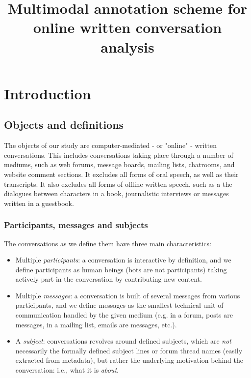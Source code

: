 \documentclass[11pt]{article}
\begin{document}
\title{Multimodal annotation scheme for online written conversation analysis}

\begin{titlepage}

\maketitle

\tableofcontents

\end{titlepage}

\section{Introduction}

\subsection{Objects and definitions}

The objects of our study are computer-mediated - or "online" - written conversations. This includes conversations taking place through a number of mediums, such as web forums, message boards, mailing lists, chatrooms, and website comment sections. It excludes all forms of oral speech, as well as their transcripts. It also excludes all forms of offline written speech, such as a the dialogues between characters in a book, journalistic interviews or messages written in a guestbook. 

\subsubsection{Participants, messages and subjects}

The conversations as we define them have three main characteristics:

\begin{itemize}
	\item Multiple \textit{participants}: a conversation is interactive by definition, and we define participants as human beings (bots are not participants) taking actively part in the conversation by contributing new content.
	\item Multiple \textit{messages}: a conversation is built of several messages from various participants, and we define messages as the smallest technical unit of communication handled by the given medium (e.g. in a forum, posts are messages, in a mailing list, emails are messages, etc.).
	\item A \textit{subject}: conversations revolves around defined subjects, which are \textit{not} necessarily the formally defined subject lines or forum thread names (easily extracted from metadata), but rather the underlying motivation behind the conversation: i.e., what it is \textit{about}.
\end{itemize}
\end{document}
